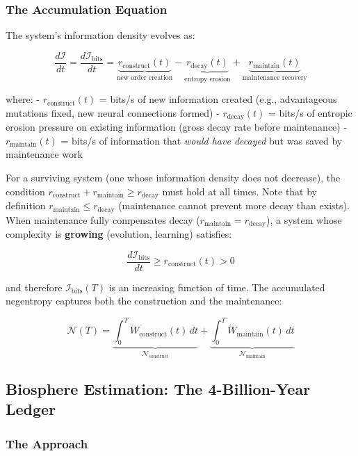 \documentclass[11pt]{article}
\theoremstyle{plain}
\theoremstyle{definition}
\theoremstyle{remark}
\let\origsubsection\subsection
\renewcommand{\subsection}{\needspace{7\baselineskip}\origsubsection}
\let\origsubsubsection\subsubsection
\renewcommand{\subsubsection}{\needspace{4\baselineskip}\origsubsubsection}
\begin{document}
\subsubsection{The Accumulation
Equation}\label{the-accumulation-equation}

The system's information density evolves as:

\[\frac{d \mathcal{I}}{dt} = \frac{d \mathcal{I}_{\text{bits}}}{dt} = \underbrace{r_{\text{construct}}(t)}_{\text{new order creation}} - \underbrace{r_{\text{decay}}(t)}_{\text{entropy erosion}} + \underbrace{r_{\text{maintain}}(t)}_{\text{maintenance recovery}}\]

where: - \(r_{\text{construct}}(t)\) = bits/s of new information created
(e.g., advantageous mutations fixed, new neural connections formed) -
\(r_{\text{decay}}(t)\) = bits/s of entropic erosion pressure on
existing information (gross decay rate before maintenance) -
\(r_{\text{maintain}}(t)\) = bits/s of information that \emph{would have
decayed} but was saved by maintenance work

For a surviving system (one whose information density does not
decrease), the condition
\(r_{\text{construct}} + r_{\text{maintain}} \geq r_{\text{decay}}\)
must hold at all times. Note that by definition
\(r_{\text{maintain}} \leq r_{\text{decay}}\) (maintenance cannot
prevent more decay than exists). When maintenance fully compensates
decay (\(r_{\text{maintain}} = r_{\text{decay}}\)), a system whose
complexity is \textbf{growing} (evolution, learning) satisfies:

\[\frac{d \mathcal{I}_{\text{bits}}}{dt} \geq r_{\text{construct}}(t) > 0\]

and therefore \(\mathcal{I}_{\text{bits}}(T)\) is an increasing function
of time. The accumulated negentropy captures both the construction and
the maintenance:

\[\mathcal{N}(T) = \underbrace{\int_0^T \dot{W}_{\text{construct}}(t) \, dt}_{\mathcal{N}_{\text{construct}}} + \underbrace{\int_0^T \dot{W}_{\text{maintain}}(t) \, dt}_{\mathcal{N}_{\text{maintain}}}\]

\subsection{Biosphere Estimation: The 4-Billion-Year
Ledger}\label{biosphere-estimation-the-4-billion-year-ledger}

\subsubsection{The Approach}\label{the-approach}
\end{document}
